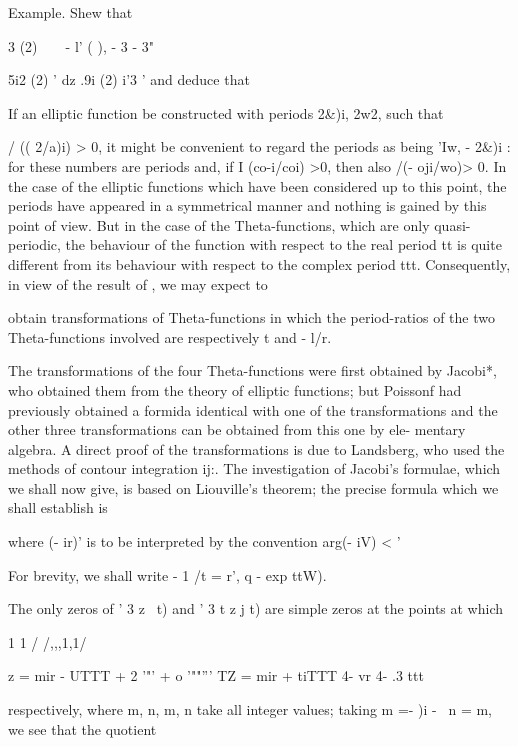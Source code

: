 Example. Shew that

  3 (2)\ \ \ \ - l' ( ), - 3 - 3"

5i2 (2) ' dz .9i (2) i'3 ' and deduce that


If an elliptic function be constructed with periods 2\&)i, 2w2, such
that

/ (( 2/a)i) > 0, it might be convenient to regard the periods as being
'Iw, - 2\&)i : for these numbers are periods and, if I (co-i/coi) >0,
then also /(- oji/wo)> 0. In the case of the elliptic functions which
have been considered up to this point, the periods have appeared in a
symmetrical manner and nothing is gained by this point of view. But in
the case of the Theta-functions, which are only quasi-periodic, the
behaviour of the function with respect to the real period tt is quite
different from its behaviour with respect to the complex period ttt.
Consequently, in view of the result of , we may expect to

%
%

obtain transformations of Theta-functions in which the period-ratios
of the two Theta-functions involved are respectively t and - l/r.

The transformations of the four Theta-functions were first obtained by
Jacobi*, who obtained them from the theory of elliptic functions; but
Poissonf had previously obtained a formida identical with one of the
transformations and the other three transformations can be obtained
from this one by ele- mentary algebra. A direct proof of the
transformations is due to Landsberg, who used the methods of contour
integration ij:. The investigation of Jacobi's formulae, which we
shall now give, is based on Liouville's theorem; the precise formula
which we shall establish is

where (- ir)' is to be interpreted by the convention arg(- iV) < '

For brevity, we shall write - 1 /t = r', q - exp ttW).

The only zeros of ' 3 z \ t) and ' 3 t z j t) are simple zeros at the
points at which

1 1 / /,,,1,1/

z = mir - UTTT + 2 '"' + o '""''' TZ = mir + tiTTT 4- vr 4- .3 ttt

respectively, where m, n, m, n take all integer values; taking m =- )i
- \, n = m, we see that the quotient

